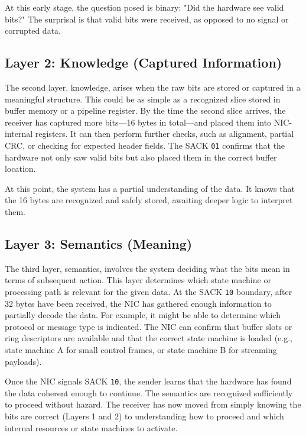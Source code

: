 \documentclass[../../../OAE-SPEC-MAIN.tex]{subfiles}
\begin{document}
At this early stage, the question posed is binary: "Did the hardware see valid bits?" The surprisal is that valid bits were received, as opposed to no signal or corrupted data.

\subsection{Layer 2: Knowledge (Captured Information)}

The second layer, knowledge, arises when the raw bits are stored or captured in a meaningful structure. This could be as simple as a recognized slice stored in buffer memory or a pipeline register. By the time the second slice arrives, the receiver has captured more bits—16 bytes in total—and placed them into NIC-internal registers. It can then perform further checks, such as alignment, partial CRC, or checking for expected header fields. The SACK \texttt{01} confirms that the hardware not only saw valid bits but also placed them in the correct buffer location.

At this point, the system has a partial understanding of the data. It knows that the 16 bytes are recognized and safely stored, awaiting deeper logic to interpret them.

\subsection{Layer 3: Semantics (Meaning)}

The third layer, semantics, involves the system deciding what the bits mean in terms of subsequent action. This layer determines which state machine or processing path is relevant for the given data. At the SACK \texttt{10} boundary, after 32 bytes have been received, the NIC has gathered enough information to partially decode the data. For example, it might be able to determine which protocol or message type is indicated. The NIC can confirm that buffer slots or ring descriptors are available and that the correct state machine is loaded (e.g., state machine A for small control frames, or state machine B for streaming payloads).

Once the NIC signals SACK \texttt{10}, the sender learns that the hardware has found the data coherent enough to continue. The semantics are recognized sufficiently to proceed without hazard. The receiver has now moved from simply knowing the bits are correct (Layers 1 and 2) to understanding how to proceed and which internal resources or state machines to activate.
\end{document}
